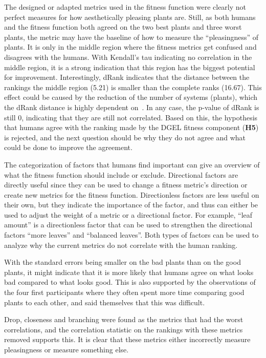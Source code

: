 The designed or adapted metrics used in the fitness function were clearly not perfect measures for how aesthetically pleasing plants are.
Still, as both humans and the fitness function both agreed on the two best plants and three worst plants, the metric may have the baseline of how to measure the ``pleasingness'' of plants.
It is only in the middle region where the fitness metrics get confused and disagrees with the humans.
With Kendall's tau indicating no correlation in the middle region, it is a strong indication that this region has the biggest potential for improvement.
Interestingly, dRank indicates that the distance between the rankings the middle region (5.21) is smaller than the complete ranks (16.67). %
This effect could be caused by the reduction of the number of systems (plants), which the dRank distance is highly dependent on~\cite{2009Carterette}.
In any case, the p-value of dRank is still 0, indicating that they are still not correlated.
Based on this, the hypothesis that humans agree with the ranking made by the \gls{DGEL} fitness component (\textbf{H5}) is rejected, and the next question should be why they do not agree and what could be done to improve the agreement.

The categorization of factors that humans find important can give an overview of what the fitness function should include or exclude.
Directional factors are directly useful since they can be used to change a fitness metric's direction or create new metrics for the fitness function.
Directionless factors are less useful on their own, but they indicate the importance of the factor, and thus can either be used to adjust the weight of a metric or a directional factor.
For example, ``leaf amount'' is a directionless factor that can be used to strengthen the directional factors ``more leaves'' and ``balanced leaves''.
Both types of factors can be used to analyze why the current metrics do not correlate with the human ranking.

With the standard errors being smaller on the bad plants than on the good plants, it might indicate that it is more likely that humans agree on what looks bad compared to what looks good.
This is also supported by the observations of the four first participants where they often spent more time comparing good plants to each other, and said themselves that this was difficult.

Drop, closeness and branching were found as the metrics that had the worst correlations, and the correlation statistic on the rankings with these metrics removed supports this.
It is clear that these metrics either incorrectly measure pleasingness or measure something else.

